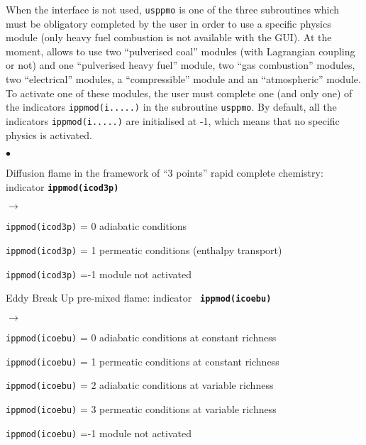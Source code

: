 {{{When the interface is not used, \texttt{usppmo} is one of the three subroutines
which must be obligatory completed by the user in order to use a specific physics module
(only heavy fuel combustion is not available with the GUI).
At the moment, \CS allows to use two ``pulverised coal'' modules
(with Lagrangian coupling or not) and one ``pulverised heavy fuel'' module,
two ``gas combustion'' modules, two ``electrical'' modules,
a ``compressible'' module and an ``atmospheric'' module. To activate one of
these modules, the user must complete one (and only one) of the
indicators \texttt{ippmod(i.....)} in the subroutine
\texttt{usppmo}. By default, all the indicators \texttt{ippmod(i.....)} are
initialised at -1, which means that no specific physics is activated.

\begin{list}{$\bullet$}{}
       \item Diffusion flame in the framework of ``3 points'' rapid complete
             chemistry: indicator {\bf \tt ippmod(icod3p)}
        \begin{list}{$\rightarrow$}{}
               \item \texttt{ippmod(icod3p)} = 0 adiabatic conditions
               \item \texttt{ippmod(icod3p)} = 1 permeatic conditions (enthalpy
                     transport)
               \item \texttt{ippmod(icod3p)} =-1 module not activated
         \end{list}
        \item Eddy Break Up pre-mixed flame: indicator {\bf \tt
             ippmod(icoebu)}
         \begin{list}{$\rightarrow$}{}
                \item \texttt{ippmod(icoebu)} = 0 adiabatic
                      conditions at constant richness
                \item \texttt{ippmod(icoebu)} = 1 permeatic conditions at
                      constant richness
                \item \texttt{ippmod(icoebu)} = 2 adiabatic conditions at
                      variable richness
                \item \texttt{ippmod(icoebu)} = 3 permeatic conditions at
                      variable richness
                \item \texttt{ippmod(icoebu)} =-1 module not activated
         \end{list}

\end{list}}}}
